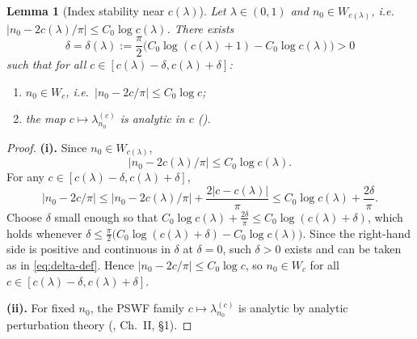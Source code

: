 \documentclass[12pt,a4paper]{amsart}
\newtheorem{lemma}[theorem]{Lemma}
\theoremstyle{definition}
\theoremstyle{remark}
\begin{document}
\begin{lemma}[Index stability near $c(\lambda)$]
\label{lem:index-stability}
Let $\lambda\in(0,1)$ and
$n_0\in W_{c(\lambda)}$,
i.e.\ $|n_0 - 2c(\lambda)/\pi|\le C_0\log c(\lambda)$.
There exists
\begin{equation}\label{eq:delta-def}
  \delta = \delta(\lambda) :=
  \frac{\pi}{2}\bigl(C_0\log(c(\lambda)+1)
  - C_0\log c(\lambda)\bigr) > 0
\end{equation}
such that for all
$c\in[c(\lambda)-\delta, c(\lambda)+\delta]$:
\begin{enumerate}[\rm(i)]
\item $n_0\in W_c$,
      i.e.\ $|n_0 - 2c/\pi|\le C_0\log c$;
\item the map $c\mapsto\lambda_{n_0}^{(c)}$
      is analytic in $c$ (\cite{Kato1966}).
\end{enumerate}
\end{lemma}
\begin{proof}
\textbf{(i).}
Since $n_0\in W_{c(\lambda)}$,
\[
  |n_0 - 2c(\lambda)/\pi| \le C_0\log c(\lambda).
\]
For any $c\in[c(\lambda)-\delta, c(\lambda)+\delta]$,
\[
  |n_0 - 2c/\pi|
  \le |n_0 - 2c(\lambda)/\pi|
      + \frac{2|c-c(\lambda)|}{\pi}
  \le C_0\log c(\lambda) + \frac{2\delta}{\pi}.
\]
Choose $\delta$ small enough so that
$C_0\log c(\lambda) + \frac{2\delta}{\pi}
\le C_0\log(c(\lambda)+\delta)$,
which holds whenever
$\delta \le \frac{\pi}{2}\bigl(
C_0\log(c(\lambda)+\delta) - C_0\log c(\lambda)\bigr)$.
Since the right-hand side is positive and
continuous in $\delta$ at $\delta=0$, such
$\delta>0$ exists and can be taken as in
\eqref{eq:delta-def}.
Hence $|n_0 - 2c/\pi| \le C_0\log c$,
so $n_0 \in W_c$ for all
$c\in[c(\lambda)-\delta, c(\lambda)+\delta]$.

\textbf{(ii).}
For fixed $n_0$, the PSWF family
$c\mapsto\lambda_{n_0}^{(c)}$ is analytic
by analytic perturbation theory
(\cite{Kato1966}, Ch.~II, \S1).
\end{proof}
\end{document}
